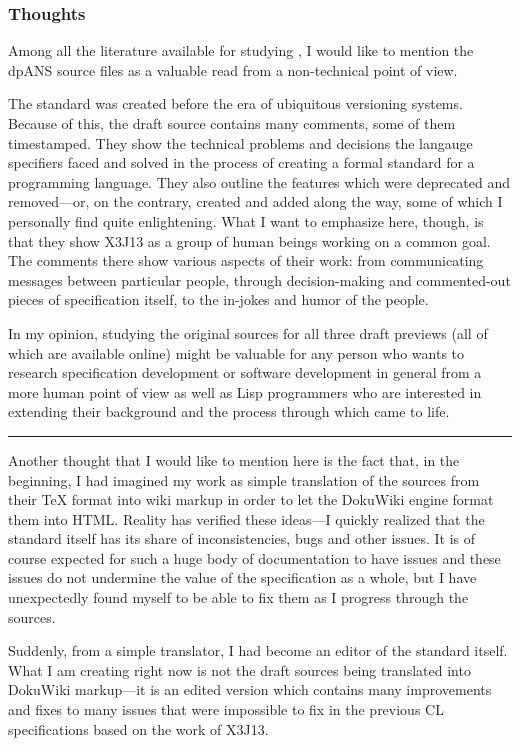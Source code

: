 \subsubsection{Thoughts}

Among all the literature available for studying \cl{}, I would like to mention the dpANS source files as a valuable read from a non-technical point of view.

The standard was created before the era of ubiquitous versioning systems. Because of this, the draft source contains many comments, some of them timestamped. They show the technical problems and decisions the langauge specifiers faced and solved in the process of creating a formal standard for a programming language. They also outline the features which were deprecated and removed---or, on the contrary, created and added along the way, some of which I personally find quite enlightening. What I want to emphasize here, though, is that they show X3J13 as a group of human beings working on a common goal. The comments there show various aspects of their work: from communicating messages between particular people, through decision-making and commented-out pieces of specification itself, to the in-jokes and humor of the people.

In my opinion, studying the original sources for all three draft previews (all of which are available online) might be valuable for any person who wants to research specification development or software development in general from a more human point of view as well as Lisp programmers who are interested in extending their background and the process through which \cl{} came to life.

\rule{\linewidth}{0.5pt}

Another thought that I would like to mention here is the fact that, in the beginning, I had imagined my work as simple translation of the sources from their \TeX{} format into wiki markup in order to let the DokuWiki engine format them into HTML. Reality has verified these ideas---I quickly realized that the standard itself has its share of inconsistencies, bugs and other issues. It is of course expected for such a huge body of documentation to have issues and these issues do not undermine the value of the specification as a whole, but I have unexpectedly found myself to be able to fix them as I progress through the sources.

Suddenly, from a simple translator, I had become an editor of the \cl{} standard itself. What I am creating right now is not the draft sources being translated into DokuWiki markup---it is an edited version which contains many improvements and fixes to many issues that were impossible to fix in the previous CL specifications based on the work of X3J13.

